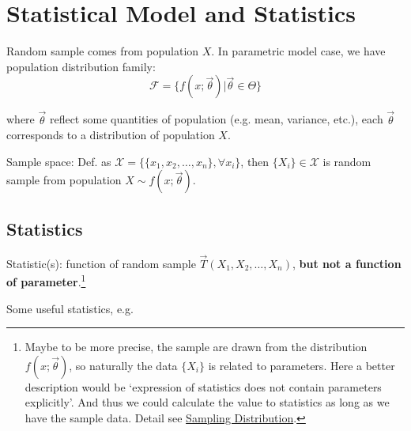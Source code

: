 \section{Statistical Model and Statistics}\label{SectionStatisticalModelandStatistics}
    Random sample comes from population $X$. In parametric model case, we have population distribution family:
    \begin{equation}\mathscr{F}=\{f(x;\vec{\theta})|\vec{\theta}\in\Theta\}\end{equation}

    where  $\vec{\theta}$ reflect some quantities of population (e.g. mean, variance, etc.), each $\vec{\theta}$ corresponds to a distribution of population $X$.
    
    Sample space: Def. as $\mathscr{X}=\{\{x_1,x_2,\ldots,x_n\},\forall x_i\}$, then $\{X_i\}\in\mathscr{X}$ is random sample from population $X\sim f(x;\vec{\theta})$.

    
\subsection{Statistics}\label{SubSectionStatistics}
    Statistic(s): function of random sample $\vec{T}(X_1,X_2,\ldots,X_n)$, \textbf{but not a function of parameter}.\footnote{Maybe to be more precise, the sample are drawn from the distribution $ f(x;\vec{\theta }) $, so naturally the data $ \{X_i\} $ is related to parameters. Here a better description would be `expression of statistics does not contain parameters explicitly'. And thus we could calculate the value to statistics as long as we have the sample data. Detail see \hyperlink{SamplingDistribution}{Sampling Distribution}.}
    
\begin{point}
    Some useful statistics, e.g.
\end{point}
    
